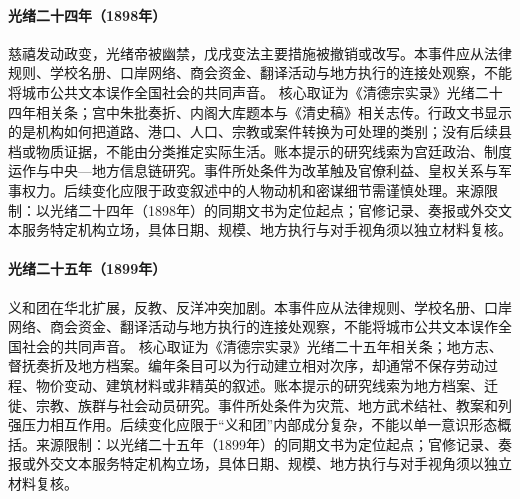 \hypertarget{civic:EQ-1898-WUXU-COUP}{}\paragraph{光绪二十四年（1898年）}慈禧发动政变，光绪帝被幽禁，戊戌变法主要措施被撤销或改写。本事件应从法律规则、学校名册、口岸网络、商会资金、翻译活动与地方执行的连接处观察，不能将城市公共文本误作全国社会的共同声音。 核心取证为《清德宗实录》光绪二十四年相关条；宫中朱批奏折、内阁大库题本与《清史稿》相关志传。行政文书显示的是机构如何把道路、港口、人口、宗教或案件转换为可处理的类别；没有后续县档或物质证据，不能由分类推定实际生活。账本提示的研究线索为宫廷政治、制度运作与中央—地方信息链研究。事件所处条件为改革触及官僚利益、皇权关系与军事权力。后续变化应限于政变叙述中的人物动机和密谋细节需谨慎处理。来源限制：以光绪二十四年（1898年）的同期文书为定位起点；官修记录、奏报或外交文本服务特定机构立场，具体日期、规模、地方执行与对手视角须以独立材料复核。
\hypertarget{civic:EQ-1899-BOXER-UPRISING}{}\paragraph{光绪二十五年（1899年）}义和团在华北扩展，反教、反洋冲突加剧。本事件应从法律规则、学校名册、口岸网络、商会资金、翻译活动与地方执行的连接处观察，不能将城市公共文本误作全国社会的共同声音。 核心取证为《清德宗实录》光绪二十五年相关条；地方志、督抚奏折及地方档案。编年条目可以为行动建立相对次序，却通常不保存劳动过程、物价变动、建筑材料或非精英的叙述。账本提示的研究线索为地方档案、迁徙、宗教、族群与社会动员研究。事件所处条件为灾荒、地方武术结社、教案和列强压力相互作用。后续变化应限于“义和团”内部成分复杂，不能以单一意识形态概括。来源限制：以光绪二十五年（1899年）的同期文书为定位起点；官修记录、奏报或外交文本服务特定机构立场，具体日期、规模、地方执行与对手视角须以独立材料复核。
